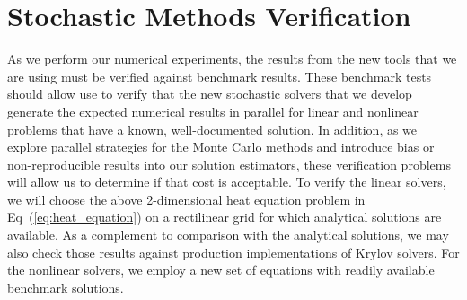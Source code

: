 \section{Stochastic Methods Verification}
\label{sec:method_verification}
As we perform our numerical experiments, the results from the new
tools that we are using must be verified against benchmark
results. These benchmark tests should allow use to verify that the new
stochastic solvers that we develop generate the expected numerical
results in parallel for linear and nonlinear problems that have a
known, well-documented solution. In addition, as we explore parallel
strategies for the Monte Carlo methods and introduce bias or
non-reproducible results into our solution estimators, these
verification problems will allow us to determine if that cost is
acceptable. To verify the linear solvers, we will choose the above
2-dimensional heat equation problem in Eq~(\ref{eq:heat_equation}) on
a rectilinear grid for which analytical solutions are available. As a
complement to comparison with the analytical solutions, we may also
check those results against production implementations of Krylov
solvers. For the nonlinear solvers, we employ a new set of equations
with readily available benchmark solutions.

